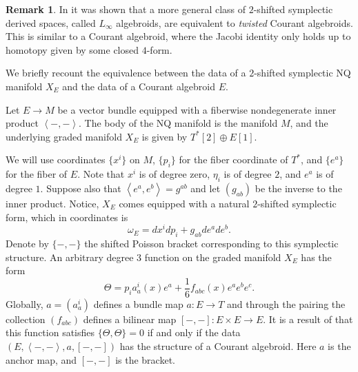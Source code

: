 \documentclass{article}
\def\xto{\xrightarrow}
\theoremstyle{definition}
\newtheorem{remark}[theorem]{Remark}
\theoremstyle{remark}
\def\brian{\textcolor{blue}{BM: }\textcolor{blue}}
\begin{document}
\begin{remark}
In \cite{PymSafronov} it was shown that a more general class of $2$-shifted symplectic derived spaces, called $L_\infty$ algebroids, are equivalent to {\em twisted} Courant algebroids. 
This is similar to a Courant algebroid, where the Jacobi identity only holds up to homotopy given by some closed $4$-form. 
\end{remark}

We briefly recount the equivalence between the data of a $2$-shifted symplectic NQ manifold $X_E$ and the data of a Courant algebroid $E$. 

\def\Sym{{\rm Sym}}

Let $E \to M$ be a vector bundle equipped with a fiberwise nondegenerate inner product $\left<-,-\right>$.
The body of the NQ manifold is the manifold $M$, and the underlying graded manifold $X_E$ is given by $T^*[2] \oplus E[1]$. 

We will use coordinates $\{x^i\}$ on $M$, $\{p_i\}$ for the fiber coordinate of $T^*$, and $\{e^a\}$ for the fiber of $E$. 
Note that $x^i$ is of degree zero, $\eta_i$ is of degree $2$, and $e^a$ is of degree $1$.
Suppose also that $\left<e^a, e^b\right> = g^{ab}$ and let $(g_{ab})$ be the inverse to the inner product. 
Notice, $X_E$ comes equipped with a natural $2$-shifted symplectic form, which in coordinates is 
\[
\omega_E = d x^i d p_i + g_{ab} d e^a d e^b .
\]
Denote by $\{-,-\}$ the shifted Poisson bracket corresponding to this symplectic structure. 
An arbitrary degree $3$ function on the graded manifold $X_E$ has the form
\[
\Theta = p_i a_a^i (x) e^a + \frac{1}{6} f_{abc} (x) e^a e^b e^c .
\]
Globally, $a = (a_a^i)$ defines a bundle map $a : E \to T$ and through the pairing the collection $(f_{abc})$ defines a bilinear map $[-,-] : E \times E \to E$. 
It is a result of \cite{Roytenberg:2002nu} that this function satisfies $\{\Theta, \Theta\} = 0$ if and only if the data $(E, \left<-,-\right>, a, [-,-])$ has the structure of a Courant algebroid. 
Here $a$ is the anchor map, and $[-,-]$ is the bracket. 

%
\end{document}
